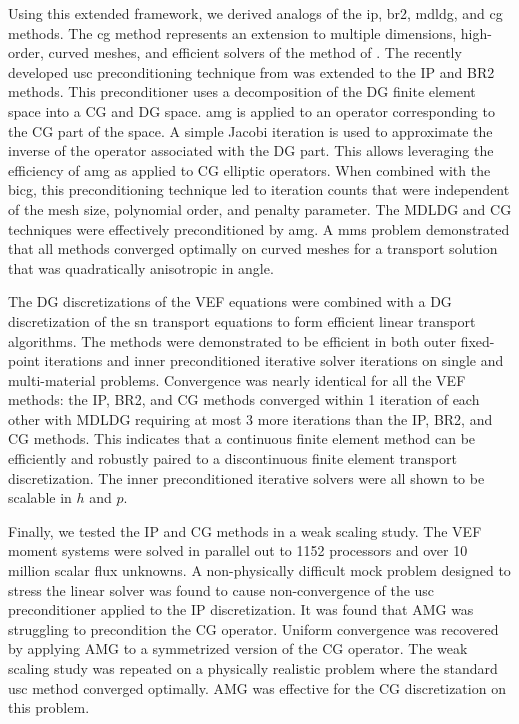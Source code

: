 \documentclass[../doc.tex]{subfiles}
\begin{document}
Using this extended framework, we derived analogs of the \gls{ip}, \gls{br2}, \gls{mdldg}, and \gls{cg} methods. The \gls{cg} method represents an extension to multiple dimensions, high-order, curved meshes, and efficient solvers of the method of \textcite{two-level-independent-warsa}. 
The recently developed \gls{usc} preconditioning technique from \textcite{Pazner2021} was extended to the IP and BR2 methods. This preconditioner uses a decomposition of the DG finite element space into a CG and DG space. \gls{amg} is applied to an operator corresponding to the CG part of the space. A simple Jacobi iteration is used to approximate the inverse of the operator associated with the DG part. This allows leveraging the efficiency of \gls{amg} as applied to CG elliptic operators. When combined with the \gls{bicg}, this preconditioning technique led to iteration counts that were independent of the mesh size, polynomial order, and penalty parameter. The MDLDG and CG techniques were effectively preconditioned by \gls{amg}. A \gls{mms} problem demonstrated that all methods converged optimally on curved meshes for a transport solution that was quadratically anisotropic in angle. 

The DG discretizations of the VEF equations were combined with a DG discretization of the \gls{sn} transport equations to form efficient linear transport algorithms. The methods were demonstrated to be efficient in both outer fixed-point iterations and inner preconditioned iterative solver iterations on single and multi-material problems. Convergence was nearly identical for all the VEF methods: the IP, BR2, and CG methods converged within 1 iteration of each other with MDLDG requiring at most 3 more iterations than the IP, BR2, and CG methods. This indicates that a continuous finite element method can be efficiently and robustly paired to a discontinuous finite element transport discretization. The inner preconditioned iterative solvers were all shown to be scalable in $h$ and $p$. 

Finally, we tested the IP and CG methods in a weak scaling study. The VEF moment systems were solved in parallel out to 1152 processors and over 10 million scalar flux unknowns. 
A non-physically difficult mock problem designed to stress the linear solver was found to cause non-convergence of the \gls{usc} preconditioner applied to the IP discretization. It was found that AMG was struggling to precondition the CG operator. Uniform convergence was recovered by applying AMG to a symmetrized version of the CG operator. The weak scaling study was repeated on a physically realistic problem where the standard \gls{usc} method converged optimally. AMG was effective for the CG discretization on this problem. 
\end{document}
